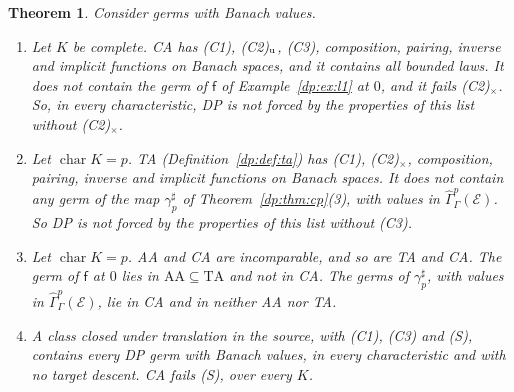 \documentclass[11pt]{amsart}
\newtheorem{theorem}{Theorem}[section]
\theoremstyle{definition}
\theoremstyle{remark}
\numberwithin{equation}{section}
\theoremstyle{plain}
\theoremstyle{definition}
\theoremstyle{plain}
\newcommand{\hGamma}{\widehat\Gamma}
\begin{document}
\begin{theorem}\label{dp:thm:descents-independent}
Consider germs with Banach values.
\begin{enumerate}
\item Let $K$ be complete. CA has \textup{(C1)}, \textup{(C2)}$_{\rm u}$, \textup{(C3)}, composition, pairing, inverse and implicit functions on Banach spaces, and it contains all bounded laws. It does not contain the germ of $\mathsf f$ of Example~\ref{dp:ex:l1} at $0$, and it fails \textup{(C2)}$_\times$. So, in every characteristic, DP is not forced by the properties of this list without \textup{(C2)}$_\times$.
\item Let $\operatorname{char}K=p$. TA (Definition~\ref{dp:def:ta}) has \textup{(C1)}, \textup{(C2)}$_\times$, composition, pairing, inverse and implicit functions on Banach spaces. It does not contain any germ of the map $\gamma^\sharp_p$ of Theorem~\ref{dp:thm:cp}(3), with values in $\hGamma^p_\Gamma(\mathcal E)$. So DP is not forced by the properties of this list without \textup{(C3)}.
\item Let $\operatorname{char}K=p$. AA and CA are incomparable, and so are TA and CA. The germ of $\mathsf f$ at $0$ lies in $\mathrm{AA}\subseteq\mathrm{TA}$ and not in CA. The germs of $\gamma^\sharp_p$, with values in $\hGamma^p_\Gamma(\mathcal E)$, lie in CA and in neither AA nor TA.
\item A class closed under translation in the source, with \textup{(C1)}, \textup{(C3)} and \textup{(S)}, contains every DP germ with Banach values, in every characteristic and with no target descent. CA fails \textup{(S)}, over every $K$.
\end{enumerate}
\end{theorem}
\end{document}
